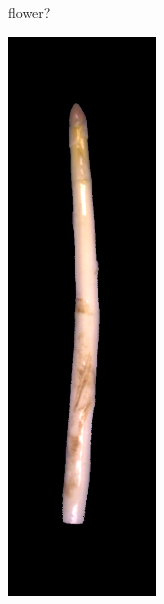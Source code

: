 \begin{figure}[!htb]
\begin{subfigure}{0.3\textwidth}
		\caption{flower?}
	\end{subfigure}
	\begin{subfigure}{0.3\textwidth}
		\includegraphics[width=0.80\linewidth]{Figures/chapter03/diff-img-violet.png}

\end{subfigure}
\end{figure}
